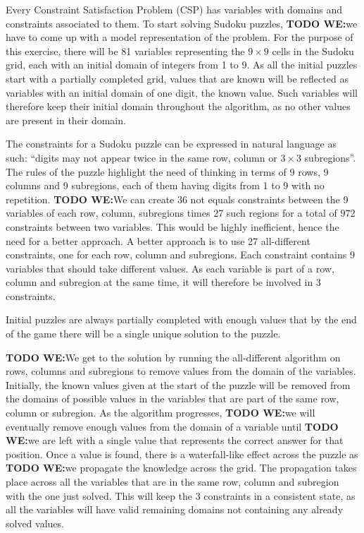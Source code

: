 \documentclass{l4proj}
\begin{document}
\noindent Every Constraint Satisfaction Problem (CSP) has variables with domains and constraints associated to them. To start solving Sudoku puzzles, \textbf{TODO WE:}we have to come up with a model representation of the problem. For the purpose of this exercise, there will be 81 variables representing the $9 \times 9$ cells in the Sudoku grid, each with an initial domain of integers from 1 to 9. As all the initial puzzles start with a partially completed grid, values that are known will be reflected as variables with an initial domain of one digit, the known value. Such variables will therefore keep their initial domain throughout the algorithm, as no other values are present in their domain.

\noindent The constraints for a Sudoku puzzle can be expressed in natural language as such: “digits may not appear twice in the same row, column or $3\times 3$ subregions”. The rules of the puzzle highlight the need of thinking in terms of 9 rows, 9 columns and 9 subregions, each of them having digits from 1 to 9 with no repetition. \textbf{TODO WE:}We can create 36 not equals constraints between the 9 variables of each row, column, subregions times 27 such regions for a total of 972 constraints between two variables. This would be highly inefficient, hence the need for a better approach. A better approach is to use 27 all-different constraints, one for each row, column and subregions. Each constraint contains 9 variables that should take different values. As each variable is part of a row, column and subregion at the same time, it will therefore be involved in 3 constraints.

\noindent Initial puzzles are always partially completed with enough values that by the end of the game there will be a single unique solution to the puzzle. 

\noindent \textbf{TODO WE:}We get to the solution by running the all-different algorithm on rows, columns and subregions to remove values from the domain of the variables. Initially, the known values given at the start of the puzzle will be removed from the domains of possible values in the variables that are part of the same row, column or subregion. As the algorithm progresses, \textbf{TODO WE:}we will eventually remove enough values from the domain of a variable until \textbf{TODO WE:}we are left with a single value that represents the correct answer for that position. Once a value is found, there is a waterfall-like effect across the puzzle as \textbf{TODO WE:}we propagate the knowledge across the grid. The propagation takes place across all the variables that are in the same row, column and subregion with the one just solved. This will keep the 3 constraints in a consistent state, as all the variables will have valid remaining domains not containing any already solved values.
\end{document}
